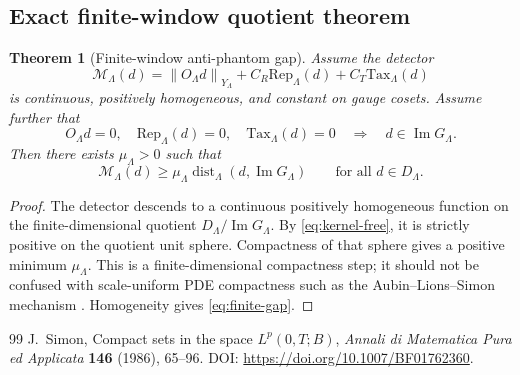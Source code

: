 \documentclass[10pt,a4paper]{amsart}
\numberwithin{equation}{section}
\newtheorem{theorem}{Theorem}[section]
\DeclareMathOperator{\dist}{dist}
\newcommand{\norm}[2]{\left\|#1\right\|_{#2}}
\newcommand{\Tax}{\mathrm{Tax}}
\newcommand{\Rep}{\mathrm{Rep}}
\newcommand{\calM}{\mathcal M}
\begin{document}
\subsection{Exact finite-window quotient theorem}


\begin{theorem}[Finite-window anti-phantom gap]\label{thm:finite-gap}
Assume the detector
\begin{equation}\label{eq:detector-size}
\calM_\Lambda(d)
=\norm{O_\Lambda d}{Y_\Lambda}
+C_R\Rep_\Lambda(d)+C_T\Tax_\Lambda(d)
\end{equation}
is continuous, positively homogeneous, and constant on gauge cosets. Assume further that
\begin{equation}\label{eq:kernel-free}
O_\Lambda d=0,
\quad
\Rep_\Lambda(d)=0,
\quad
\Tax_\Lambda(d)=0
\quad\Longrightarrow\quad
d\in\operatorname{Im}G_\Lambda.
\end{equation}
Then there exists $\mu_\Lambda>0$ such that
\begin{equation}\label{eq:finite-gap}
\calM_\Lambda(d)
\ge
\mu_\Lambda\dist_\Lambda(d,\operatorname{Im}G_\Lambda)
\qquad
\text{for all }d\in D_\Lambda.
\end{equation}
\end{theorem}

\begin{proof}
The detector descends to a continuous positively homogeneous function on the finite-dimensional quotient $D_\Lambda/\operatorname{Im}G_\Lambda$. By \eqref{eq:kernel-free}, it is strictly positive on the quotient unit sphere. Compactness of that sphere gives a positive minimum $\mu_\Lambda$. This is a finite-dimensional compactness step; it should not be confused with scale-uniform PDE compactness such as the Aubin--Lions--Simon mechanism \cite{Simon1986}. Homogeneity gives \eqref{eq:finite-gap}.
\end{proof}


\begin{thebibliography}{99}
 J.~Simon, \newblock Compact sets in the space $L^p(0,T;B)$, \newblock \emph{Annali di Matematica Pura ed Applicata} \textbf{146} (1986), 65--96. \newblock DOI: \url{https://doi.org/10.1007/BF01762360}.
\end{thebibliography}
\end{document}
